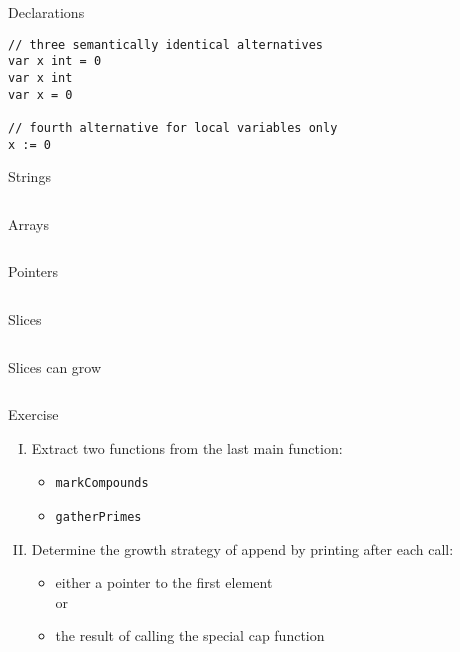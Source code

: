 \documentclass[10pt]{beamer}
\begin{document}
	\begin{frame}[fragile]{Declarations}
		\begin{verbatim}
// three semantically identical alternatives
var x int = 0
var x int
var x = 0

// fourth alternative for local variables only
x := 0
		\end{verbatim}
	\end{frame}

	
	\begin{frame}[fragile]{Strings}
		\inputminted{go}{code/02_strings.go}
	\end{frame}

	
	\begin{frame}[fragile]{Arrays}
		\inputminted{go}{code/03_arrays.go}
	\end{frame}

	
	\begin{frame}[fragile]{Pointers}
		\inputminted{go}{code/04_pointers.go}
	\end{frame}
	
	
	\begin{frame}[fragile]{Slices}
		\inputminted{go}{code/05_slices.go}
	\end{frame}
	
	
	\begin{frame}[fragile]{Slices can grow}
		\inputminted{go}{code/06_sieve.go}
	\end{frame}
	
	
	\begin{frame}[fragile]{Exercise}
		\begin{enumerate}[I.]
			\item Extract two functions from the last main function:
				\begin{itemize}
					\item \texttt{markCompounds}
					\item \texttt{gatherPrimes}
				\end{itemize}
			\item Determine the growth strategy of append by printing after each call:
				\begin{itemize}
					\item either a pointer to the first element\\
					or\\
					\item the result of calling the special cap function
				\end{itemize}
		\end{enumerate}
	\end{frame}
		
\end{document}
